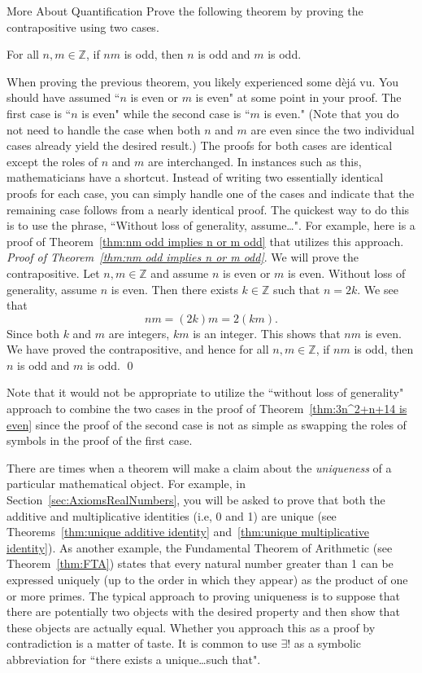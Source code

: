 \begin{section}{More About Quantification}
Prove the following theorem by proving the contrapositive using two cases.

\begin{theorem}\label{thm:nm odd implies n or m odd} %
For all $n,m\in\mathbb{Z}$, if $nm$ is odd, then $n$ is odd and $m$ is odd.
\end{theorem}

When proving the previous theorem, you likely experienced some d\`ej\'a vu. You should have assumed ``$n$ is even or $m$ is even" at some point in your proof. The first case is ``$n$ is even" while the second case is ``$m$ is even."  (Note that you do not need to handle the case when both $n$ and $m$ are even since the two individual cases already yield the desired result.) The proofs for both cases are identical except the roles of $n$ and $m$ are interchanged.  In instances such as this, mathematicians have a shortcut. Instead of writing two essentially identical proofs for each case, you can simply handle one of the cases and indicate that the remaining case follows from a nearly identical proof.  The quickest way to do this is to use the phrase, ``Without loss of generality, assume\ldots".  For example, here is a proof of Theorem~\ref{thm:nm odd implies n or m odd} that utilizes this approach.\\

\noindent \emph{Proof of Theorem~\ref{thm:nm odd implies n or m odd}}. We will prove the contrapositive.  Let $n,m\in\mathbb{Z}$ and assume $n$ is even or $m$ is even. Without loss of generality, assume $n$ is even.  Then there exists $k\in\mathbb{Z}$ such that $n=2k$. We see that
\[
nm=(2k)m=2(km).
\]
Since both $k$ and $m$ are integers, $km$ is an integer. This shows that $nm$ is even. We have proved the contrapositive, and hence for all $n,m\in\mathbb{Z}$, if $nm$ is odd, then $n$ is odd and $m$ is odd. \qed

Note that it would not be appropriate to utilize the ``without loss of generality" approach to combine the two cases in the proof of Theorem~\ref{thm:3n^2+n+14 is even} since the proof of the second case is not as simple as swapping the roles of symbols in the proof of the first case.

There are times when a theorem will make a claim about the \emph{uniqueness} of a particular mathematical object.  For example, in Section~\ref{sec:AxiomsRealNumbers}, you will be asked to prove that both the additive and multiplicative identities (i.e, 0 and 1) are unique (see Theorems~\ref{thm:unique additive identity} and~\ref{thm:unique multiplicative identity}). As another example, the Fundamental Theorem of Arithmetic (see Theorem~\ref{thm:FTA}) states that every natural number greater than 1 can be expressed uniquely (up to the order in which they appear) as the product of one or more primes. The typical approach to proving uniqueness is to suppose that there are potentially two objects with the desired property and then show that these objects are actually equal. Whether you approach this as a proof by contradiction is a matter of taste. It is common to use $\boxed{\exists!}$ as a symbolic abbreviation for ``there exists a unique\ldots such that".


\end{section}
